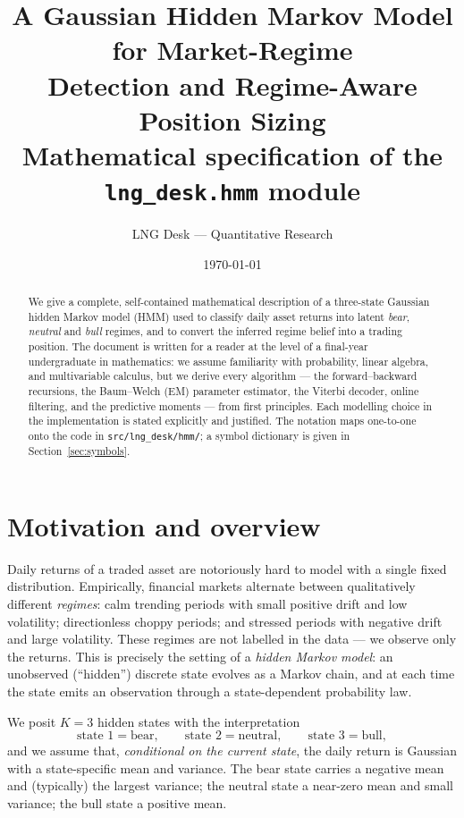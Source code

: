 \documentclass[11pt]{article}
\title{\textbf{A Gaussian Hidden Markov Model for Market-Regime\\ Detection and Regime-Aware Position Sizing}\\[4pt]
\large Mathematical specification of the \texttt{lng\_desk.hmm} module}
\author{LNG Desk --- Quantitative Research}
\date{\today}
\newcommand{\nstate}{K}
\theoremstyle{plain}
\theoremstyle{definition}
\theoremstyle{remark}
\begin{document}
\maketitle

\begin{abstract}
We give a complete, self-contained mathematical description of a three-state
Gaussian hidden Markov model (HMM) used to classify daily asset returns into
latent \emph{bear}, \emph{neutral} and \emph{bull} regimes, and to convert the
inferred regime belief into a trading position. The document is written for a
reader at the level of a final-year undergraduate in mathematics: we assume
familiarity with probability, linear algebra, and multivariable calculus, but we
derive every algorithm --- the forward--backward recursions, the Baum--Welch
(EM) parameter estimator, the Viterbi decoder, online filtering, and the
predictive moments --- from first principles. Each modelling choice in the
implementation is stated explicitly and justified. The notation maps one-to-one
onto the code in \texttt{src/lng\_desk/hmm/}; a symbol dictionary is given in
Section~\ref{sec:symbols}.
\end{abstract}

\tableofcontents

\section{Motivation and overview}

Daily returns of a traded asset are notoriously hard to model with a single
fixed distribution. Empirically, financial markets alternate between
qualitatively different \emph{regimes}: calm trending periods with small
positive drift and low volatility; directionless choppy periods; and stressed
periods with negative drift and large volatility. These regimes are not labelled
in the data --- we observe only the returns. This is precisely the setting of a
\emph{hidden Markov model}: an unobserved (``hidden'') discrete state evolves as
a Markov chain, and at each time the state emits an observation through a
state-dependent probability law.

We posit $\nstate=3$ hidden states with the interpretation
\[
\text{state }1=\text{bear},\qquad
\text{state }2=\text{neutral},\qquad
\text{state }3=\text{bull},
\]
and we assume that, \emph{conditional on the current state}, the daily return is
Gaussian with a state-specific mean and variance. The bear state carries a
negative mean and (typically) the largest variance; the neutral state a
near-zero mean and small variance; the bull state a positive mean.
\end{document}
